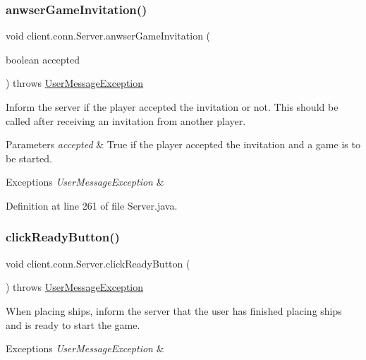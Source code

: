 \subsubsection{\texorpdfstring{anwser\+Game\+Invitation()}{anwserGameInvitation()}}
{\footnotesize\ttfamily void client.\+conn.\+Server.\+anwser\+Game\+Invitation (\begin{DoxyParamCaption}\item[{boolean}]{accepted }\end{DoxyParamCaption}) throws \hyperlink{classpt_1_1up_1_1fe_1_1lpro1613_1_1sharedlib_1_1exceptions_1_1_user_message_exception}{User\+Message\+Exception}}

Inform the server if the player accepted the invitation or not. This should be called after receiving an invitation from another player. 
\begin{DoxyParams}{Parameters}
{\em accepted} & True if the player accepted the invitation and a game is to be started. \\
\hline
\end{DoxyParams}

\begin{DoxyExceptions}{Exceptions}
{\em User\+Message\+Exception} & \\
\hline
\end{DoxyExceptions}


Definition at line 261 of file Server.\+java.

\hypertarget{classclient_1_1conn_1_1_server_a7e54680c0fb053bee969c41f093aa5c4}{}\label{classclient_1_1conn_1_1_server_a7e54680c0fb053bee969c41f093aa5c4} 
\subsubsection{\texorpdfstring{click\+Ready\+Button()}{clickReadyButton()}}
{\footnotesize\ttfamily void client.\+conn.\+Server.\+click\+Ready\+Button (\begin{DoxyParamCaption}{ }\end{DoxyParamCaption}) throws \hyperlink{classpt_1_1up_1_1fe_1_1lpro1613_1_1sharedlib_1_1exceptions_1_1_user_message_exception}{User\+Message\+Exception}}

When placing ships, inform the server that the user has finished placing ships and is ready to start the game. 
\begin{DoxyExceptions}{Exceptions}
{\em User\+Message\+Exception} & \\
\hline
\end{DoxyExceptions}


